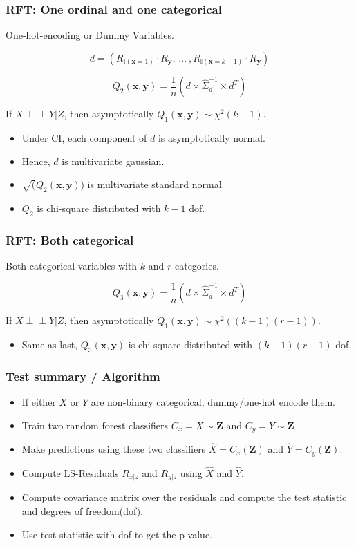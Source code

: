 \documentclass{beamer}
\def\ci{\perp\!\!\!\!\!\perp}
\begin{document}
\begin{frame}
	\frametitle{RFT: One ordinal and one categorical}
	One-hot-encoding or Dummy Variables.

	$$ d = (R_{\mathbb{I}(\mathbf{x}=1)} \cdot R_{\mathbf{y}}, \, \ldots \ ,
		R_{\mathbb{I}(\mathbf{x}=k-1)} \cdot R_{\mathbf{y}}
	)$$

	$$ Q_2(\bm{x}, \bm{y}) = \frac{1}{n} (d \times \hat{\Sigma}_d^{-1} \times d^T) $$

	If $ X \ci Y | Z $, then asymptotically $ Q_1(\bm{x}, \bm{y}) \sim \chi^2(k-1) $.
	\begin{itemize}
		\item Under CI, each component of $ d $ is asymptotically normal.
		\item Hence, $ d $ is multivariate gaussian.
		\item $ \sqrt(Q_2(\bm{x}, \bm{y})) $ is multivariate standard normal.
		\item $ Q_2 $ is chi-square distributed with $ k-1 $ dof.
	\end{itemize}
\end{frame}

\begin{frame}
	\frametitle{RFT: Both categorical}
	Both categorical variables with $ k $ and $ r $ categories.


	$$ Q_3(\bm{x}, \bm{y}) = \frac{1}{n} (d \times \hat{\Sigma}_d^{-1} \times d^T) $$

	If $ X \ci Y | Z $, then asymptotically $ Q_1(\bm{x}, \bm{y}) \sim
	\chi^2((k-1)(r-1)) $.

	\begin{itemize}
		\item Same as last, $ Q_3(\bm{x}, \bm{y}) $ is chi square distributed 
			with $ (k-1)(r-1) $ dof.
	\end{itemize}
\end{frame}

\begin{frame}
	\frametitle{Test summary / Algorithm}
	\begin{itemize}
		\item If either $ X $ or $ Y $ are non-binary categorical,
			dummy/one-hot encode them.
		\item Train two random forest classifiers $ C_x = X \sim \bm{Z} $ and
			$ C_y = Y \sim \bm{Z} $
		\item Make predictions using these two classifiers $ \hat{X} =
			C_x(\bm{Z}) $ and $ \hat{Y} = C_y(\bm{Z}) $.
		\item Compute LS-Residuals $ R_{x|z} $ and $ R_{y|z} $ using $
			\hat{X} $ and $ \hat{Y} $.
		\item Compute covariance matrix over the residuals and compute the
			test statistic and degrees of freedom(dof).
		\item Use test statistic with dof to get the p-value.
	\end{itemize}
\end{frame}
\end{document}
